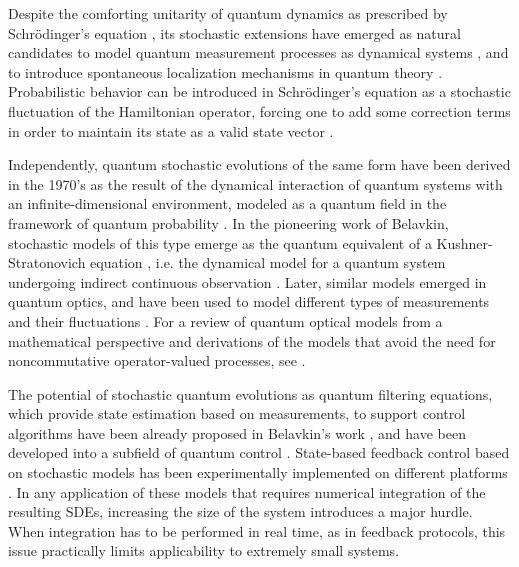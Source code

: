 \documentclass[aihp,12pt]{imsart}
\begin{document}
Despite the comforting unitarity of quantum dynamics as prescribed by Schr\"odinger's equation \cite{von2018mathematical}, its stochastic extensions have emerged as natural candidates to model quantum measurement processes as dynamical systems \cite{percival1998quantum,adler2001martingale}, and to introduce spontaneous localization mechanisms in quantum theory \cite{ghirardi1985model,ghirardi1990markov}.  Probabilistic behavior can be introduced in Schr\"odinger's equation as a stochastic fluctuation of the Hamiltonian operator, forcing one to add some correction terms in order to maintain its state as a valid state vector \cite{barchielli2009quantum}. 

Independently, quantum stochastic evolutions of the same form have been derived in the 1970's as the result of the dynamical interaction of quantum systems with an infinite-dimensional environment, modeled as a quantum field in the framework of quantum probability \cite{parthasarathy2012introduction}. In the pioneering work of Belavkin, stochastic models of this type emerge as the quantum equivalent of a Kushner-Stratonovich equation \cite{Kushner,stratonovich1965conditional, Bucy}, i.e. the dynamical model for a quantum system undergoing indirect continuous observation \cite{BELAVKIN1992171,bouten_quantum_2006,bouten2007introduction,vanhandel2008stabilityquantummarkovfilters}. Later, similar models emerged in quantum optics, and have been used to model different types of measurements and their fluctuations \cite{carmichael1993open,wiseman1994quantum, wiseman2009quantum}. For a review of quantum optical models from a mathematical perspective and derivations of the models that avoid the need for noncommutative operator-valued processes, see \cite{barchielli2009quantum}. 

The potential of stochastic quantum evolutions as quantum filtering equations, which provide state estimation based on measurements, to support control algorithms have been already proposed in Belavkin's work \cite{belavkin2004towards}, and have been developed into a subfield of quantum control \cite{altafini2012modeling}. State-based feedback control based on stochastic models has been experimentally implemented on different platforms \cite{sayrin2011real, bonato2016optimized}. In any application of these models that requires numerical integration of the resulting SDEs, increasing the size of the system introduces a major hurdle. When integration has to be performed in real time, as in feedback protocols, this issue practically limits applicability to extremely small systems. 
\end{document}
